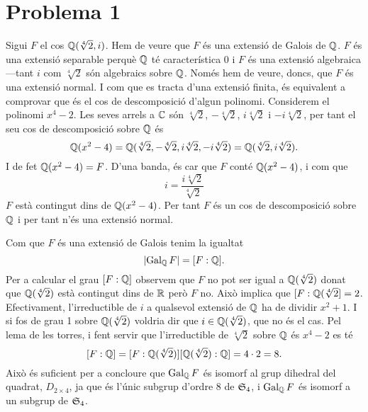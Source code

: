 \documentclass[12pt]{article}
\title{\sffamily {\bfseries Entrega 2}}
\author{\sffamily Arnau Mas}
\date{\sffamily 9 de gener de 2019}
\begin{document}
\maketitle

\section*{Problema 1}
Sigui \( F \) el cos \( \Q(\sqrt[4]{2}, i) \). Hem de veure que \( F \) és una extensió de
Galois de \( \Q \). \( F \) és una extensió separable perquè \( \Q \) té característica 0
i \( F \) és una extensió algebraica ---tant \( i \) com \( \sqrt[4]{2} \) són algebraics
sobre \( \Q \). Només hem de veure, doncs, que \( F \) és una extensió normal. I com que
es tracta d'una extensió finita, és equivalent a comprovar que és el cos de descomposició
d'algun polinomi. Considerem el polinomi \( x^4 - 2 \). Les seves arrels a \( \C \) són \(
\sqrt[4]{2} \), \( -\sqrt[4]{2} \), \( i \sqrt[4]{2} \) i \( -i \sqrt[4]{2} \), per tant
el seu cos de descomposició sobre \( \Q \) és
\begin{equation*}
	\Q(x^2 - 4) = \Q(\sqrt[4]{2}, -\sqrt[4]{2}, i\sqrt[4]{2}, -i\sqrt[4]{2}) =
	\Q(\sqrt[4]{2}, i\sqrt[4]{2}).
\end{equation*}
I de fet \( \Q(x^2 - 4) = F \). D'una banda, és car que \( F \) conté \( \Q(x^2 - 4) \), i
com que
\begin{equation*}
	i = \frac{i \sqrt[4]{2}}{\sqrt[4]{2}}
\end{equation*}
\( F \) està contingut dins de \( \Q(x^2 - 4) \). Per tant \( F \) és un cos de
descomposició sobre \( \Q \) i per tant n'és una extensió normal.

\parbreak

Com que \( F \) és una extensió de Galois tenim la igualtat
\begin{equation*}
	\abs{\GalQ{F}} = \exte{F}{\Q}. 
\end{equation*}
Per a calcular el grau \( \exte{F}{\Q} \) observem que \( F \) no pot ser igual a \(
\Q(\sqrt[4]{2}) \) donat que \( \Q(\sqrt[4]{2}) \) està contingut dins de \( \R \) però \(
F \) no. Això implica que \( \exte{F}{\Q(\sqrt[4]{2}} = 2 \). Efectivament,
l'irreductible de \( i \) a qualsevol extensió de \( \Q \) ha de dividir \( x^2 + 1 \).
I si fos de grau 1 sobre \( \Q(\sqrt[4]{2}) \) voldria dir que \( i \in \Q(\sqrt[4]{2})
\), que no és el cas. Pel lema de les torres, i fent servir que l'irreductible de \(
\sqrt[4]{2} \) sobre \( \Q \) és \( x^4 - 2 \) es té
\begin{equation*}
	\exte{F}{\Q} = \exte{F}{\Q(\sqrt[4]{2})} \ext{\Q}{\sqrt[4]{2}} = 4 \cdot 2 = 8. 
\end{equation*}
Això és suficient per a concloure que \( \GalQ{F} \) és isomorf al grup dihedral del
quadrat, \( D_{2 \times 4} \), ja que és l'únic subgrup d'ordre 8 de \( \S_4 \), i \(
\GalQ{F} \) és isomorf a un subgrup de \( \S_4 \).
\end{document}
